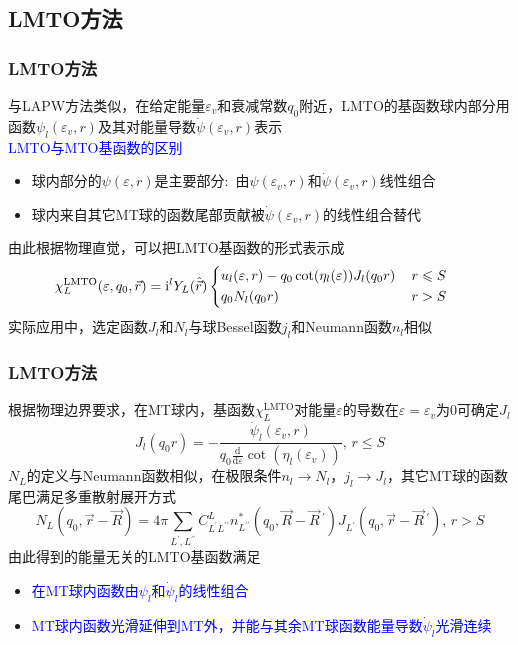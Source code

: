 \subsection{\rm{LMTO}方法}
\frame
{
	\frametitle{\textrm{LMTO}方法}
	与\textrm{LAPW}方法类似，在给定能量$\varepsilon_v$和衰减常数$q_0$附近，\textrm{LMTO}的基函数球内部分用函数$\psi_l(\varepsilon_v,r)$及其对能量导数$\dot\psi(\varepsilon_v,r)$表示\\
\textcolor{blue}{\textrm{LMTO}与\textrm{MTO}基函数的区别}
	\begin{itemize}
		\item 球内部分的$\psi(\varepsilon,r)$是主要部分:~由$\psi(\varepsilon_v,r)$和$\dot\psi(\varepsilon_v,r)$线性组合
		\item 球内来自其它\textrm{MT}球的函数尾部贡献被$\dot\psi(\varepsilon_v,r)$的线性组合替代
	\end{itemize}
	由此根据物理直觉，可以把\textrm{LMTO}基函数的形式表示成
		\begin{displaymath}
			\hspace*{-12pt}\chi_L^{\mathrm{LMTO}}(\varepsilon,q_0,\vec r)=\mathrm{i}^lY_L(\hat{\vec r})\left\{
			\begin{aligned}
				&u_l(\varepsilon,r)-q_0\cot(\eta_l(\varepsilon))J_l(q_0r)&\, r\leqslant S\\
				&q_0N_l(q_0r)&\, r>S
			\end{aligned}\right.
		\end{displaymath}
		实际应用中，选定函数$J_l$和$N_l$与球\textrm{Bessel}函数$j_l$和\textrm{Neumann}函数$n_l$相似
}

\frame
{
	\frametitle{\textrm{LMTO}方法}
	根据物理边界要求，在\textrm{MT}球内，基函数$\chi_L^{\mathrm{LMTO}}$对能量$\varepsilon$的导数在$\varepsilon=\varepsilon_v$为0可确定$J_l$
		\begin{displaymath}
			J_l(q_0r)=-\dfrac{\dot{\psi}_l(\varepsilon_v,r)}{q_0\frac{\mathrm{d}}{\mathrm{d}\varepsilon}\cot(\eta_l(\varepsilon_v))},\,r\leqslant S
		\end{displaymath}
		$N_L$的定义与\textrm{Neumann}函数相似，在极限条件$n_l\rightarrow N_l$，$j_l\rightarrow J_l$，其它\textrm{MT}球的函数尾巴满足多重散射展开方式
		\begin{displaymath}
				N_L(q_0,\vec r-\vec R)=4\pi\sum_{L^{\prime},L^{\prime\prime}}C_{L^{\prime}L^{\prime\prime}}^Ln_{L^{\prime\prime}}^{\ast}(q_0,\vec R-\vec R\,^{\prime})J_{L^{\prime}}(q_0,\vec r-\vec R\,^{\prime}),\,r>S
		\end{displaymath}
		由此得到的能量无关的\textrm{LMTO}基函数满足
		\begin{itemize}
			\item \textcolor{blue}{在\textrm{MT}球内函数由$\psi_l$和$\dot{\psi}_l$的线性组合}
			\item \textcolor{blue}{\textrm{MT}球内函数光滑延伸到\textrm{MT}外，并能与其余\textrm{MT}球函数能量导数$\dot{\psi}_l$光滑连续}
		\end{itemize}
}

